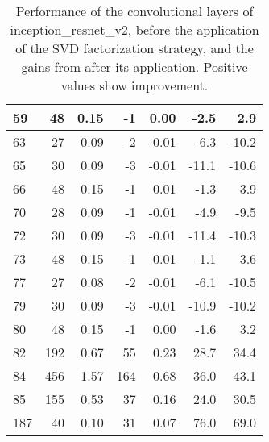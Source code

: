 \begin{table}
\begin{tabular}{|l|r|r|r|r|r|r|}
59 & 48 & 0.15 & -1 & 0.00 & -2.5 & 2.9 \\\hline
63 & 27 & 0.09 & -2 & -0.01 & -6.3 & -10.2 \\\hline
65 & 30 & 0.09 & -3 & -0.01 & -11.1 & -10.6 \\\hline
66 & 48 & 0.15 & -1 & 0.01 & -1.3 & 3.9 \\\hline
70 & 28 & 0.09 & -1 & -0.01 & -4.9 & -9.5 \\\hline
72 & 30 & 0.09 & -3 & -0.01 & -11.4 & -10.3 \\\hline
73 & 48 & 0.15 & -1 & 0.01 & -1.1 & 3.6 \\\hline
77 & 27 & 0.08 & -2 & -0.01 & -6.1 & -10.5 \\\hline
79 & 30 & 0.09 & -3 & -0.01 & -10.9 & -10.2 \\\hline
80 & 48 & 0.15 & -1 & 0.00 & -1.6 & 3.2 \\\hline
82 & 192 & 0.67 & 55 & 0.23 & 28.7 & 34.4 \\\hline
84 & 456 & 1.57 & 164 & 0.68 & 36.0 & 43.1 \\\hline
85 & 155 & 0.53 & 37 & 0.16 & 24.0 & 30.5 \\\hline
187 & 40 & 0.10 & 31 & 0.07 & 76.0 & 69.0 \\\hline
\end{tabular}
\caption{Performance of the convolutional layers of inception\_resnet\_v2, before the application of the SVD factorization strategy, and the gains from after its application. Positive values show improvement.}
\label{inception_resnet_v2-performance}
\end{table}

